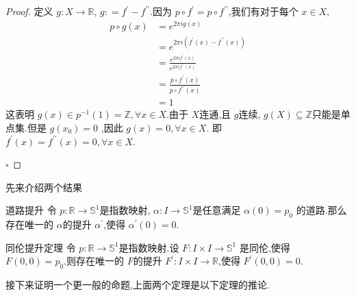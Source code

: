 \documentclass[../../几何与拓扑.tex]{subfiles}
\begin{document}
\begin{proof}

    定义 \(  g: X \to \mathbb{R}   \), \(  g : =  f^{\prime} - f ^{\prime \prime}   \).因为 \(  p \circ f ^{\prime}  =  p \circ f ^{\prime \prime}   \),我们有对于每个 \(  x \in X  \), \[
    \begin{aligned}
    p\circ g\left( x \right) & =  e^{2\pi i g\left( x \right) }\\ 
     &=  e^{2\pi i\left( f^{\prime} \left( x \right)- f ^{\prime \prime} \left( x \right)   \right) }\\ 
      & =  \frac{ e^{2\pi i f^{\prime} \left( x \right) } }{e^{2\pi i f ^{\prime \prime} \left( x \right) } }   \\ 
       & =  \frac{p\circ f^{\prime} \left( x \right)  }{  p \circ f ^{\prime \prime} \left( x \right) }\\ 
        & =  1 
    \end{aligned}
    \] 这表明 \(  g\left( x \right) \in  p ^{-1} \left( 1 \right)= \mathbb{Z}  , \forall  x \in X  \).由于 \(  X  \)连通,且 \(  g  \)连续, \(  g\left( X \right) \subseteq \mathbb{Z}   \)只能是单点集.但是 \(  g\left( x_0 \right)= 0   \)        ,因此 \(  g \left( x \right)= 0,\forall x \in X   \).
    即 \(  f^{\prime} \left( x \right)= f ^{\prime \prime} \left( x \right) = 0, \forall x \in X    \).  

    \hfill $\square$
\end{proof}

先来介绍两个结果
\begin{theorem}{道路提升}
    令 \(  p: \mathbb{R} \to \mathbb{S}^{1}  \)是指数映射, \(   \alpha : I \to \mathbb{S}^{1}  \)是任意满足 \(   \alpha \left( 0 \right)= p_0   \)   的道路.那么存在唯一的 \(  \alpha   \)的提升 \(  \alpha ^{\prime}   \),使得 \(  \alpha ^{\prime} \left( 0 \right)= 0   \).   
    
\end{theorem}


\begin{theorem}{同伦提升定理}
    令 \(  p: \mathbb{R} \to \mathbb{S}^{1}  \)是指数映射.设 \(  F: I \times  I\to  \mathbb{S}^{1}  \)  是同伦,使得 \(  F\left( 0,0 \right)= p_0   \).则存在唯一的 \(  F  \)的提升 \(  F^{\prime} : I \times  I \to \mathbb{R}   \),使得 \(  F^{\prime} \left( 0,0 \right)= 0   \).    
\end{theorem}



接下来证明一个更一般的命题,上面两个定理是以下定理的推论.
\end{document}
